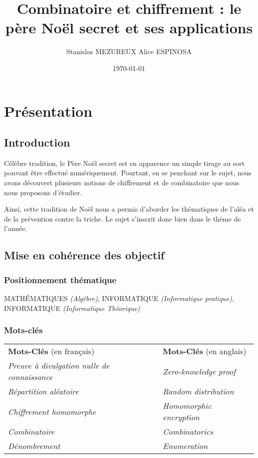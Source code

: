 \documentclass[a4paper, 12pt]{report}
\title{Combinatoire et chiffrement : le père Noël secret et ses applications}
\author{Stanislas MEZUREUX \quad Alice ESPINOSA}
\date{\today}
\begin{document}
\maketitle
\tableofcontents

\chapter{Présentation}
    \section{Introduction}
        Célèbre tradition, le Père Noël secret est en apparence un simple tirage au sort pouvant être effectué numériquement. Pourtant, en se penchant sur le sujet, nous avons découvert plusieurs notions de chiffrement et de combinatoire que nous nous proposons d’étudier.
        
        Ainsi, cette tradition de Noël nous a permis d’aborder les thématiques de l’aléa et de la prévention contre la triche. Le sujet s’inscrit donc bien dans le thème de l’année.
    \section{Mise en cohérence des objectif}
        \subsection{Positionnement thématique}
            MATHÉMATIQUES \textit{(Algèbre)}, INFORMATIQUE \textit{(Informatique pratique)}, INFORMATIQUE \textit{(Informatique Théorique)}
        \subsection{Mots-clés}
            \begin{tabular}{ll}
                \textbf{Mots-Clés} (en français) &  \textbf{Mots-Clés} (en anglais)\\
                \textit{Preuve à divulgation nulle de connaissance} & \textit{Zero-knowledge proof} \\
                \textit{Répartition aléatoire} & \textit{Random distribution} \\ 
                \textit{Chiffrement homomorphe} & \textit{Homomorphic encryption}\\ 
                \textit{Combinatoire} & \textit{Combinatorics} \\ 
                \textit{Dénombrement} & \textit{Enumeration}
            \end{tabular}
\end{document}
